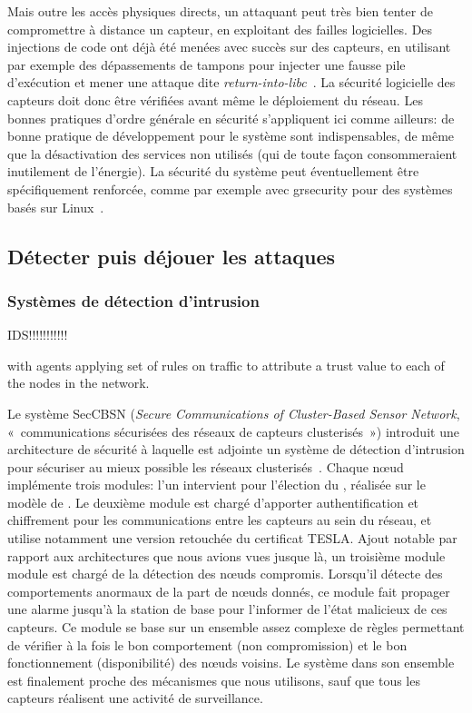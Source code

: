 Mais outre les accès physiques directs, un attaquant peut très bien tenter de compromettre à distance un capteur, en exploitant des failles logicielles.
Des injections de code ont déjà été menées avec succès sur des capteurs, en utilisant par exemple des dépassements de tampons pour injecter une fausse pile d'exécution et mener une attaque dite \textit{return-into-libc}~\cite{FC08}.
La sécurité logicielle des capteurs doit donc être vérifiées avant même le déploiement du réseau.
Les bonnes pratiques d'ordre générale en sécurité s'appliquent ici comme ailleurs: de bonne pratique de développement pour le système sont indispensables, de même que la désactivation des services non utilisés (qui de toute façon consommeraient inutilement de l'énergie).
La sécurité du système peut éventuellement être spécifiquement renforcée, comme par exemple avec grsecurity pour des systèmes basés sur Linux~\cite{GFN11}.

\subsection{Détecter puis déjouer les attaques}

\subsubsection{Systèmes de détection d'intrusion}
IDS!!!!!!!!!!!



with agents applying set of rules\cite{RKKK13} on traffic to attribute a trust value to each of the nodes in the network.

Le système SecCBSN (\textit{Secure Communications of Cluster-Based Sensor Network}, « communications sécurisées des réseaux de capteurs clusterisés ») introduit une architecture de sécurité à laquelle est adjointe un système de détection d'intrusion pour sécuriser au mieux possible les réseaux clusterisés~\cite{HHC07}.
Chaque nœud implémente trois modules: l'un intervient pour l'élection du \ch, réalisée sur le modèle de \leach.
Le deuxième module est chargé d'apporter authentification et chiffrement pour les communications entre les capteurs au sein du réseau, et utilise notamment une version retouchée du certificat TESLA.
Ajout notable par rapport aux architectures que nous avions vues jusque là, un troisième module module est chargé de la détection des nœuds compromis.
Lorsqu'il détecte des comportements anormaux de la part de nœuds donnés, ce module fait propager une alarme jusqu'à la station de base pour l'informer de l'état malicieux de ces capteurs.
Ce module se base sur un ensemble assez complexe de règles permettant de vérifier à la fois le bon comportement (non compromission) et le bon fonctionnement (disponibilité) des nœuds voisins.
Le système dans son ensemble est finalement proche des mécanismes que nous utilisons, sauf que tous les capteurs réalisent une activité de surveillance.

